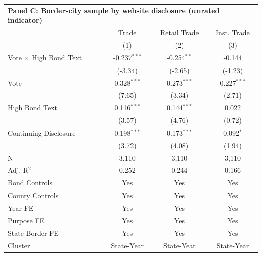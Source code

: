 \begingroup
\centering
\begin{tabular*}{\textwidth}{@{\extracolsep{\fill}}lccc}
\multicolumn{5}{l}{\textbf{Panel C: Border-city sample by website disclosure (unrated indicator)}}\\

\addlinespace
   \toprule
                                 & Trade          & Retail Trade  & Inst. Trade\\  
                                 & (1)            & (2)           & (3)\\  
   \midrule 
   Vote $\times$ High Bond Text  & -0.237$^{***}$ & -0.254$^{**}$ & -0.144\\   
                                 & (-3.34)       & (-2.65)      & (-1.23)\\   
   Vote                          & 0.328$^{***}$  & 0.273$^{***}$ & 0.227$^{***}$\\   
                                 & (7.65)        & (3.34)       & (2.71)\\   
   High Bond Text                & 0.116$^{***}$  & 0.144$^{***}$ & 0.022\\   
                                 & (3.57)        & (4.76)       & (0.72)\\   
   Continuing Disclosure         & 0.198$^{***}$  & 0.173$^{***}$ & 0.092$^{*}$\\   
                                 & (3.72)        & (4.08)       & (1.94)\\   
   \hline
   N                  & 3,110          & 3,110         & 3,110\\  
   Adj. R$^2$                & 0.252          & 0.244         & 0.166\\  
   Bond Controls                 & Yes            & Yes           & Yes\\  
   County Controls               & Yes            & Yes           & Yes\\  
   Year FE                       & Yes            & Yes           & Yes\\  
   Purpose FE                    & Yes            & Yes           & Yes\\  
   State-Border FE               & Yes            & Yes           & Yes\\  
   Cluster              & State-Year & State-Year & State-Year\\  
   \bottomrule
\end{tabular*}
\par\endgroup

